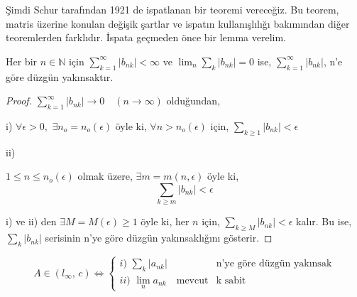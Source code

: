 Şimdi Schur tarafından 1921 de ispatlanan bir teoremi vereceğiz. Bu teorem, matris üzerine konulan değişik şartlar ve ispatın kullanışlılığı bakımından diğer teoremlerden farklıdır. İspata geçmeden önce bir lemma verelim.

\begin{lemma}
Her bir $n\in\mathbb{N}$ için $\sum\limits_{k=1}^\infty|b_{nk}|<\infty$ ve $\lim_n\sum\limits_k|b_{nk}|=0$ ise, $\sum\limits_{k=1}^\infty|b_{nk}|$, n'e göre düzgün yakınsaktır.
\end{lemma}
\begin{proof}
$\sum\limits_{k=1}^\infty|b_{nk}|\to 0\quad(n\to\infty)$ olduğundan,

i)
$\forall\epsilon>0,\,\,\exists n_o=n_o(\epsilon)$ öyle ki, $\forall n>n_o(\epsilon)$ için, $\sum\limits_{k\geq 1}|b_{nk}|<\epsilon$

ii)

$1\leq n\leq n_o(\epsilon)$ olmak üzere, $\exists m=m(n,\epsilon)$ öyle ki, 
$$
\sum\limits_{k\geq m}|b_{nk}|<\epsilon
$$

i) ve ii) den $\exists M=M(\epsilon)\geq 1$ öyle ki, her $n$ için, $\sum\limits_{k\geq M}|b_{nk}|<\epsilon$ kalır. Bu ise, $\sum\limits_k|b_{nk}|$ serisinin n'ye göre düzgün yakınsaklığını gösterir.
\end{proof}
\begin{theorem}
$$
A\in(l_\infty,\,c)\iff
	\begin{cases}
		i)\,\,\sum\limits_k|a_{nk}| & \text{n'ye göre düzgün yakınsak}\\
		ii)\,\,\lim_na_{nk}\quad\text{mevcut} & \text{k sabit}
	\end{cases}
$$
\end{theorem}

